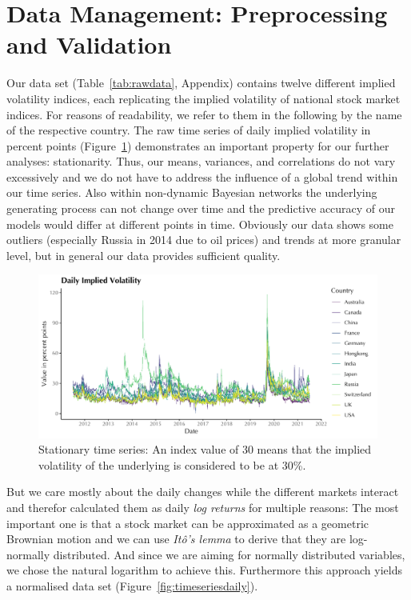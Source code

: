 \documentclass[twoside,twocolumn]{article}
\begin{document}
\section{Data Management: Preprocessing and Validation}
Our data set (Table~\ref{tab:rawdata}, Appendix) contains twelve different implied volatility indices, each replicating the implied volatility of national stock market indices.  For reasons of readability, we refer to them in the following by the name of the respective country. The raw time series of daily implied volatility in percent points (Figure~\ref{fig:timeseriesraw}) demonstrates an important property for our further analyses: stationarity. Thus, our means, variances, and correlations do not vary excessively and we do not have to address the influence of a global trend within our time series. Also within non-dynamic Bayesian networks the underlying generating process can not change over time and the predictive accuracy of our models would differ at different points in time. Obviously our data shows some outliers (especially Russia in 2014 due to oil prices) and trends at more granular level, but in general our data provides sufficient quality. \cite{Glymour2019} \cite{Shumway2017}
\begin{figure}[H]
\centering
  \includegraphics[trim={0 0 0 0},clip, width=1.0\linewidth]{../1. Code/Implied Volatility/Exports/Data/Timeseries1}
  \caption[Daily Implied Volatility]{Stationary time series: An index value of 30 means that the implied volatility of the underlying is considered to be at 30\%.}
  \label{fig:timeseriesraw}
  \end{figure}
  
But we care mostly about the daily changes while the different markets interact and therefor calculated them as daily \textit{log returns} for multiple reasons: The most important one is that a stock market can be approximated as a geometric Brownian motion and we can use \textit{It\^{o}'s lemma} to derive that they are log-normally distributed. And since we are aiming for normally distributed variables, we chose the natural logarithm to achieve this. Furthermore this approach yields a normalised data set (Figure~\ref{fig:timeseriesdaily}).  \cite{Joshi2008} \cite{Hull2021}
\end{document}
